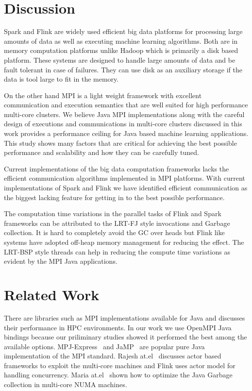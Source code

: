 \documentclass[10pt, conference, compsocconf]{IEEEtran}
\begin{document}
\section{Discussion}
Spark and Flink are widely used efficient big data platforms for processing large amounts of data as well as executing machine learning algorithms. Both are in memory computation platforms unlike Hadoop which is primarily a disk based platform. These systems are designed to handle large amounts of data and be fault tolerant in case of failures. They can use disk as an auxiliary storage if the data is tool large to fit in the memory. 

On the other hand MPI is a light weight framework with excellent communication and execution semantics that are  well suited for high performance multi-core clusters. We believe Java MPI implementations along with the careful design of executions and communications in multi-core clusters discussed in this work provides a performance ceiling for Java based machine learning applications. This study shows many factors that are critical for achieving the best possible performance and scalability and how they can be carefully tuned. 

Current implementations of the big data computation frameworks lacks the efficient communication algorithms implemented in MPI platforms. With current implementations of Spark and Flink we have identified efficient communication as the biggest lacking feature for getting in to the best possible performance. 

The computation time variations in the parallel tasks of Flink and Spark frameworks can be attributed to the \ac{LRT-FJ} style invocations and Garbage collection. It is hard to completely avoid the GC over heads but Flink like systems have adopted off-heap memory management for reducing the effect. The \ac{LRT-BSP} style threads can  help in reducing the compute time variations as evident by the MPI Java applications.  


\section{Related Work} \label{sec:related}
There are libraries such as MPI implementations available for Java and \cite{taboada2013java} discusses their performance in HPC environments. In our work we use OpenMPI Java bindings because our priliminary studies showed it performed the best among the available options. MPJ-Express~\cite{baker2006mpj} and JaMP~\cite{klemm2007jamp} are popular pure Java implementation of the MPI standard. Rajesh at.el~\cite{karmani2009actor} discusses actor based frameworks to exploit the multi-core machines and Flink uses actor model for handling concurrency. Maria at.el~\cite{carpen2015performance} shown how to optimize the Java Garbage collection in multi-core NUMA machines.
\end{document}
